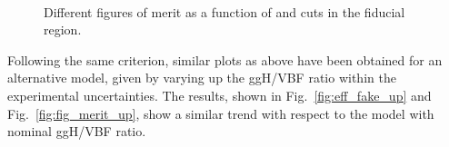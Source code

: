 \begin{figure}[htb]
\centering
{}
\\
\caption{Different figures of merit as a function of \MET and \mt cuts in the fiducial region.}\label{fig:fig_merit_nom}
\end{figure}

Following the same criterion, similar plots as above have been obtained for an alternative model, given by varying up the ggH/VBF ratio within the experimental uncertainties. The results, shown in Fig.~\ref{fig:eff_fake_up} and Fig.~\ref{fig:fig_merit_up}, show a similar trend with respect to the model with nominal ggH/VBF ratio.

